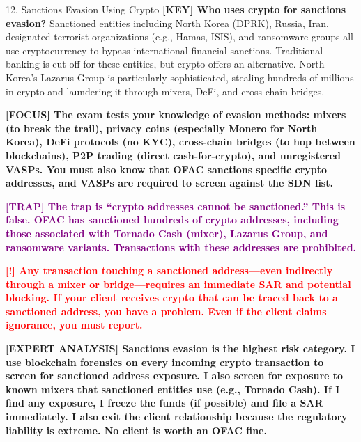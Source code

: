 \documentclass[11pt,a4paper]{beamer}
\newcommand{\redflag}[1]{\textcolor{red}{\textbf{[!] #1}}}
\newcommand{\examfocus}[1]{\textcolor{orange!80!black}{\textbf{[FOCUS] #1}}}
\newcommand{\trap}[1]{\textcolor{purple}{\textbf{[TRAP] #1}}}
\newcommand{\keyterm}[1]{\textcolor{red!80!black}{\textbf{[KEY] #1}}}
\newcommand{\expert}[1]{\textcolor{blue!70!black}{\textbf{[EXPERT ANALYSIS] #1}}}
\begin{document}
	\begin{frame}{12. Sanctions Evasion Using Crypto}
		\tiny
		\keyterm{Who uses crypto for sanctions evasion?} Sanctioned entities including North Korea (DPRK), Russia, Iran, designated terrorist organizations (e.g., Hamas, ISIS), and ransomware groups all use cryptocurrency to bypass international financial sanctions. Traditional banking is cut off for these entities, but crypto offers an alternative. North Korea's Lazarus Group is particularly sophisticated, stealing hundreds of millions in crypto and laundering it through mixers, DeFi, and cross-chain bridges.
		
		\vspace{0.1cm}
		\examfocus{The exam tests your knowledge of evasion methods: mixers (to break the trail), privacy coins (especially Monero for North Korea), DeFi protocols (no KYC), cross-chain bridges (to hop between blockchains), P2P trading (direct cash-for-crypto), and unregistered VASPs. You must also know that OFAC sanctions specific crypto addresses, and VASPs are required to screen against the SDN list.}
		
		\vspace{0.1cm}
		\trap{The trap is “crypto addresses cannot be sanctioned.” This is false. OFAC has sanctioned hundreds of crypto addresses, including those associated with Tornado Cash (mixer), Lazarus Group, and ransomware variants. Transactions with these addresses are prohibited.}
		
		\vspace{0.1cm}
		\redflag{Any transaction touching a sanctioned address—even indirectly through a mixer or bridge—requires an immediate SAR and potential blocking. If your client receives crypto that can be traced back to a sanctioned address, you have a problem. Even if the client claims ignorance, you must report.}
		
		\vspace{0.1cm}
		\expert{Sanctions evasion is the highest risk category. I use blockchain forensics on every incoming crypto transaction to screen for sanctioned address exposure. I also screen for exposure to known mixers that sanctioned entities use (e.g., Tornado Cash). If I find any exposure, I freeze the funds (if possible) and file a SAR immediately. I also exit the client relationship because the regulatory liability is extreme. No client is worth an OFAC fine.}
	\end{frame}
	
\end{document}

